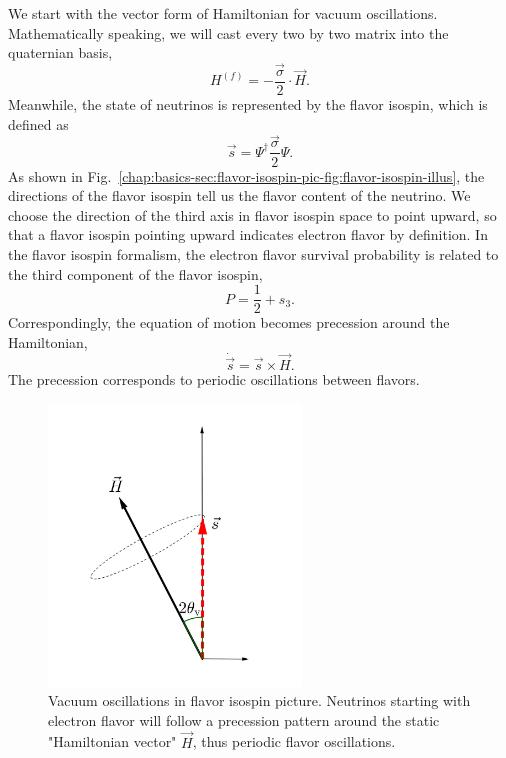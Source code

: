 We start with the vector form of Hamiltonian for vacuum oscillations. Mathematically speaking, we will cast every two by two matrix into the quaternian basis,
\begin{equation}
    H^{(f)} = - \frac{\vec{\sigma} }{2}\cdot \vec H.
\end{equation}
Meanwhile, the state of neutrinos is represented by the flavor isospin, which is defined as
\begin{equation}
    \vec s = \Psi^{\dagger} \frac{\vec{\sigma} }{2} \Psi.
\end{equation}
As shown in Fig.~\ref{chap:basics-sec:flavor-isospin-pic-fig:flavor-isospin-illus}, the directions of the flavor isospin tell us the flavor content of the neutrino. We choose the direction of the third axis in flavor isospin space to point upward, so that a flavor isospin pointing upward indicates electron flavor by definition. In the flavor isospin formalism, the electron flavor survival probability is related to the third component of the flavor isospin,
\begin{equation*}
P = \frac{1}{2} + s_3.
\end{equation*}
Correspondingly, the equation of motion becomes precession around the Hamiltonian,
\begin{equation}
\dot{\vec s} = \vec s \times \vec H.
\label{chap:basics-sec:flavor-isospin-pic-eqn:eom-precession}
\end{equation}
The precession corresponds to periodic oscillations between flavors.

\begin{figure}
    \centering
    \vspace*{-20pt}
    \includegraphics[width=0.6\textwidth]{chapters/assets/basics/flavor-isospin-vac-osc}
    \caption{Vacuum oscillations in flavor isospin picture. Neutrinos starting with electron flavor will follow a precession pattern around the static "Hamiltonian vector" $\vec H$, thus periodic flavor oscillations.}
    \label{chap:basics-sec:flavor-isospin-pic-fig:flavor-isospin-vac-osc}
\end{figure}


